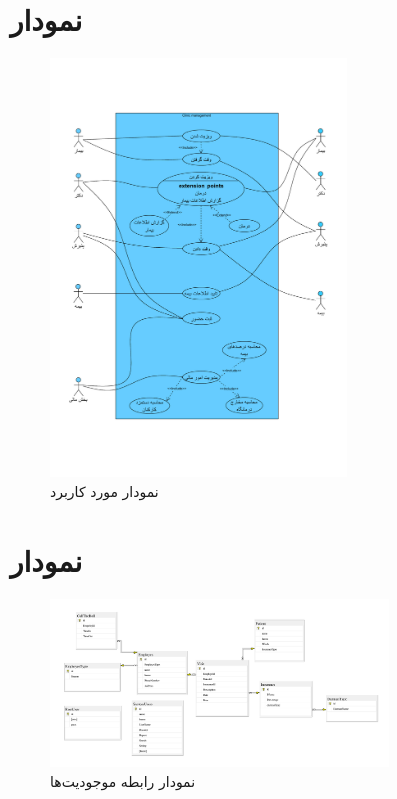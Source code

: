\documentclass[a4paper,12pt]{report}
\begin{document}
	\section{
		نمودار 
	}\label{sec1:chap2}
	\vspace{-2cm}
	\begin{figure}[!h]
		\label{fig1:sec1:chap2}
		\begin{center}
			\includegraphics[width=0.7\textwidth]{diagrams/useCase.pdf}
			\caption{نمودار مورد کاربرد}
		\end{center}
	\end{figure}

	\pagebreak
	\section{
		نمودار 
		}\label{sec2:chap2}
	\begin{figure}[!h]
		\label{fig1:sec2:chap2}
		\begin{center}
			\includegraphics[width=0.8\textwidth]{diagrams/ERD.pdf}
			\caption{نمودار رابطه موجودیت‌ها}
		\end{center}
	\end{figure}
\end{document}
